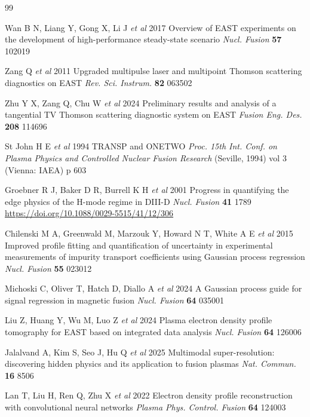 \documentclass[a4paper,12pt]{ctexart}
\begin{document}
\begin{thebibliography}{99}

Wan B N, Liang Y, Gong X, Li J \textit{et al} 2017 Overview of EAST experiments on the development of high-performance steady-state scenario \textit{Nucl. Fusion} \textbf{57} 102019

Zang Q \textit{et al} 2011 Upgraded multipulse laser and multipoint Thomson scattering diagnostics on EAST \textit{Rev. Sci. Instrum.} \textbf{82} 063502

Zhu Y X, Zang Q, Chu W \textit{et al} 2024 Preliminary results and analysis of a tangential TV Thomson scattering diagnostic system on EAST \textit{Fusion Eng. Des.} \textbf{208} 114696

St John H E \textit{et al} 1994 TRANSP and ONETWO \textit{Proc. 15th Int. Conf. on Plasma Physics and Controlled Nuclear Fusion Research} (Seville, 1994) vol 3 (Vienna: IAEA) p 603

Groebner R J, Baker D R, Burrell K H \textit{et al} 2001 Progress in quantifying the edge physics of the H-mode regime in DIII-D \textit{Nucl. Fusion} \textbf{41} 1789 \url{https://doi.org/10.1088/0029-5515/41/12/306}

Chilenski M A, Greenwald M, Marzouk Y, Howard N T, White A E \textit{et al} 2015 Improved profile fitting and quantification of uncertainty in experimental measurements of impurity transport coefficients using Gaussian process regression \textit{Nucl. Fusion} \textbf{55} 023012

Michoski C, Oliver T, Hatch D, Diallo A \textit{et al} 2024 A Gaussian process guide for signal regression in magnetic fusion \textit{Nucl. Fusion} \textbf{64} 035001

Liu Z, Huang Y, Wu M, Luo Z \textit{et al} 2024 Plasma electron density profile tomography for EAST based on integrated data analysis \textit{Nucl. Fusion} \textbf{64} 126006

Jalalvand A, Kim S, Seo J, Hu Q \textit{et al} 2025 Multimodal super-resolution: discovering hidden physics and its application to fusion plasmas \textit{Nat. Commun.} \textbf{16} 8506

Lan T, Liu H, Ren Q, Zhu X \textit{et al} 2022 Electron density profile reconstruction with convolutional neural networks \textit{Plasma Phys. Control. Fusion} \textbf{64} 124003


\end{thebibliography}
\end{document}
